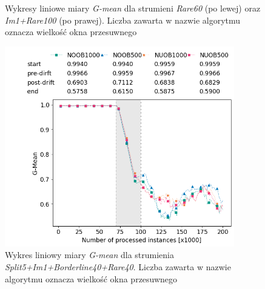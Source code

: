 \begin{figure}[h]
    \centering
    \qquad
    \caption{Wykresy liniowe miary \textit{G-mean} dla strumieni \textit{Rare60} (po lewej) oraz \textit{Im1+Rare100} (po prawej). Liczba zawarta w nazwie algorytmu oznacza wielkość okna przesuwnego}\label{Figure:WindowParametrization1}
\end{figure}

\newpage

\begin{figure}[h]
    \centering
    \includegraphics[width=10cm]{figures/split5im1borderline40rare40_window.png}
    \caption{Wykres liniowy miary \textit{G-mean} dla strumienia \textit{Split5+Im1+Borderline40+Rare40}. Liczba zawarta w nazwie algorytmu oznacza wielkość okna przesuwnego}\label{Figure:WindowParametrization2}
\end{figure}


